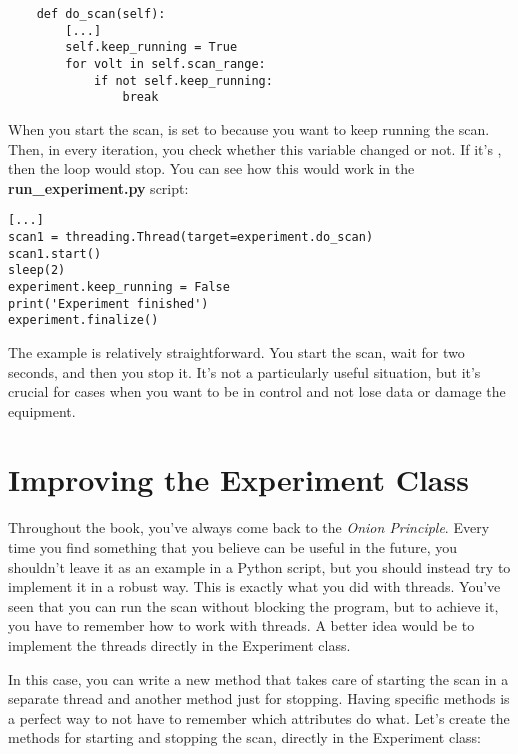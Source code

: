 \begin{verbatim}
    def do_scan(self):
        [...]
        self.keep_running = True
        for volt in self.scan_range:
            if not self.keep_running:
                break
\end{verbatim}
When you start the scan,  is set to  because you want to keep running the scan. Then, in every iteration, you check whether this variable changed or not. If it's , then the loop would stop. You can see how this would work in the \textbf{run\_experiment.py} script:

\begin{verbatim}
[...]
scan1 = threading.Thread(target=experiment.do_scan)
scan1.start()
sleep(2)
experiment.keep_running = False
print('Experiment finished')
experiment.finalize()
\end{verbatim}

The example is relatively straightforward. You start the scan, wait for two seconds, and then you stop it. It's not a particularly useful situation, but it's crucial for cases when you want to be in control and not lose data or damage the equipment.


\section{Improving the Experiment Class}\label{sec:improving-experiment}
Throughout the book, you've always come back to the \emph{Onion Principle}. Every time you find something that you believe can be useful in the future, you shouldn't leave it as an example in a Python script, but you should instead try to implement it in a robust way. This is exactly what you did with threads. You've seen that you can run the scan without blocking the program, but to achieve it, you have to remember how to work with threads. A better idea would be to implement the threads directly in the Experiment class.

In this case, you can write a new method that takes care of starting the scan in a separate thread and another method just for stopping. Having specific methods is a perfect way to not have to remember which attributes do what. Let's create the methods for starting and stopping the scan, directly in the Experiment class:

